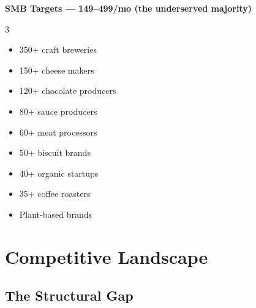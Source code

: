 \documentclass[11pt,a4paper]{article}
\begin{document}
\begin{productbox}
\textbf{\color{miloprimary}SMB Targets --- \texteuro{}149--499/mo (the underserved majority)}\\[4pt]
\begin{multicols}{3}
\begin{itemize}[leftmargin=1em, itemsep=1pt, font=\small]
  \item 350+ craft breweries
  \item 150+ cheese makers
  \item 120+ chocolate producers
  \item 80+ sauce producers
  \item 60+ meat processors
  \item 50+ biscuit brands
  \item 40+ organic startups
  \item 35+ coffee roasters
  \item Plant-based brands
\end{itemize}
\end{multicols}
\end{productbox}

\clearpage

\section{Competitive Landscape}

\subsection{The Structural Gap}
\end{document}
